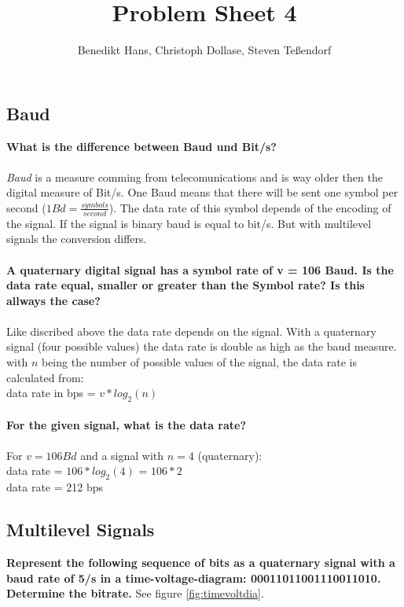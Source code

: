 \documentclass[a4paper,12pt]{article}
\author{Benedikt Hans, Christoph Dollase, Steven Te\ss endorf}
\title{ \textbf{Problem Sheet 4}} %
\begin{document}
	 
	\maketitle	 %
	
\subsection{Baud}
\textbf{What is the difference between Baud und Bit/s?}\\
\\
\textit{Baud} is a measure comming from telecomunications and is way older then the digital measure of Bit/s.
One Baud means that there will be sent one symbol per second ($1Bd = \frac{symbols}{second}$). The data rate of this symbol depends of the encoding of the signal. If the signal is binary baud is equal to bit/s. But with multilevel signals the conversion differs.\\
\\
\textbf{A quaternary digital signal has a symbol rate of v = 106 Baud. Is the data rate equal,	smaller or greater than the Symbol rate? Is this allways the case?}\\
\\
Like discribed above the data rate depends on the signal. With a quaternary signal (four possible values) the data rate is double as high as the baud measure. \\
with $n$ being the number of possible values of the signal, the data rate is calculated from: \\
data rate in bps = $v * log_{2}(n)$ \\
\\ 
\textbf{For the given signal, what is the data rate?}\\
\\
For $v = 106 Bd$ and a signal with $n=4$ (quaternary):\\
data rate = $106 * log_{2}(4)$ = $106 * 2$ \\
data rate = 212 bps


\subsection{Multilevel Signals}
\textbf{Represent the following sequence of bits as a quaternary signal with a baud rate of 5/s in a time-voltage-diagram: 00011011001110011010. Determine the bitrate.} See figure \ref{fig:timevoltdia}.
\end{document}
